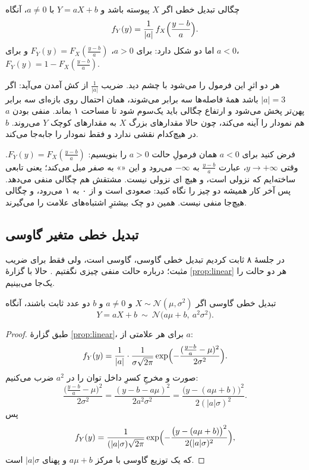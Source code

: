 \begin{proposition}[label=prop:linear]{چگالی تبدیل خطی}
اگر $X$ پیوسته باشد و $Y=aX+b$ با $a\ne0$، آنگاه
\[ f_Y(y)=\frac{1}{|a|}\,f_X\Bigl(\frac{y-b}{a}\Bigr). \]
 اما دو شکل دارد: برای $a>0$، $F_Y(y)=F_X(\frac{y-b}{a})$ و برای $a<0$، $F_Y(y)=1-F_X(\frac{y-b}{a})$.
\end{proposition}

هر دو اثرِ این فرمول را می‌شود با چشم دید. ضریب $\frac1{|a|}$ از کش آمدن می‌آید: اگر $|a|=3$ باشد همهٔ فاصله‌ها سه برابر می‌شوند، همان احتمال روی بازه‌ای سه برابر پهن‌تر پخش می‌شود و ارتفاع چگالی باید یک‌سوم شود تا مساحت ۱ بماند. منفی بودن $a$ هم نمودار را آینه می‌کند، چون حالا مقدارهای بزرگ $X$ به مقدارهای کوچک $Y$ می‌روند. $b$ در هیچ‌کدام نقشی ندارد و فقط نمودار را جابه‌جا می‌کند.

\begin{warning}
فرض کنید برای $a<0$ همان فرمولِ حالت $a>0$ را بنویسیم: $F_Y(y)=F_X(\frac{y-b}{a})$. وقتی $y\to+\infty$، عبارت $\frac{y-b}{a}$ به $-\infty$ می‌رود و این «» به صفر میل می‌کند؛ یعنی تابعی ساخته‌ایم که نزولی است، و هیچ ای نزولی نیست. مشتقش هم چگالی منفی می‌دهد. پس آخر کار همیشه دو چیز را نگاه کنید:  صعودی است و از ۰ به ۱ می‌رود، و چگالی هیچ‌جا منفی نیست. همین دو چک بیشترِ اشتباه‌های علامت را می‌گیرند.
\end{warning}

\subsection{تبدیل خطی متغیر گاوسی}

در جلسهٔ ۸ ثابت کردیم تبدیل خطی گاوسی، گاوسی است، ولی فقط برای ضریب مثبت؛ درباره حالت  منفی چیزی نگفتیم . حالا با گزارهٔ \ref{prop:linear} هر دو حالت را یک‌جا می‌بینیم.

\begin{theorem}[label=thm:gauss-lin]{تبدیل خطی گاوسی}
اگر $X\sim\mathcal N(\mu,\sigma^2)$ و $a\ne0$ و $b$ دو عدد ثابت باشند، آنگاه
\[ Y=aX+b\ \sim\ \mathcal N\bigl(a\mu+b,\ a^2\sigma^2\bigr). \]
\end{theorem}

\begin{proof}
طبق گزارهٔ \ref{prop:linear}، برای هر علامتی از $a$:
\[ f_Y(y)=\frac1{|a|}\cdot\frac{1}{\sigma\sqrt{2\pi}}\exp\Bigl(-\frac{(\frac{y-b}{a}-\mu)^2}{2\sigma^2}\Bigr). \]
صورت و مخرجِ کسرِ داخل توان را در $a^2$ ضرب می‌کنیم:
\[ \frac{\bigl(\frac{y-b}{a}-\mu\bigr)^2}{2\sigma^2}=\frac{(y-b-a\mu)^2}{2a^2\sigma^2}=\frac{\bigl(y-(a\mu+b)\bigr)^2}{2(|a|\sigma)^2}. \]
پس
\[ f_Y(y)=\frac{1}{(|a|\sigma)\sqrt{2\pi}}\exp\Bigl(-\frac{\bigl(y-(a\mu+b)\bigr)^2}{2(|a|\sigma)^2}\Bigr), \]
که یک توزیع  گاوسی با مرکز $a\mu+b$ و پهنای $|a|\sigma$ است.
\end{proof}

